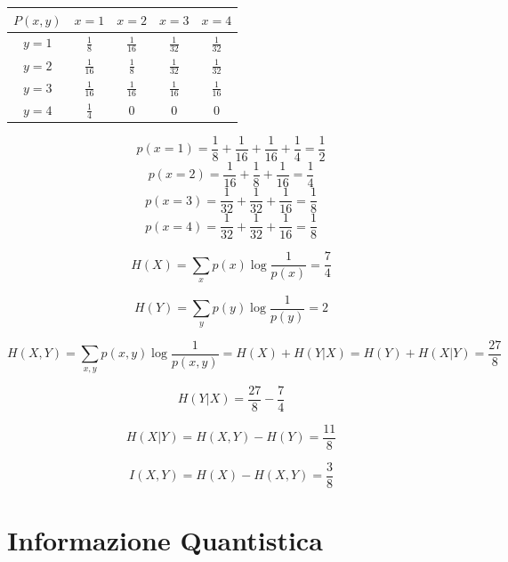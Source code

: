 \documentclass{report}
\begin{document}
\begin{table}[H]
    \centering
    \renewcommand{\arraystretch}{1.5} %
    \begin{tabular}{|c|c|c|c|c|}
        \hline
        $P(x,y)$ & $x=1$ & $x=2$ & $x=3$ & $x=4$ \\
        \hline
        $y=1$ & $\frac{1}{8}$ & $\frac{1}{16}$ & $\frac{1}{32}$ & $\frac{1}{32}$ \\
        \hline
        $y=2$ & $\frac{1}{16}$ & $\frac{1}{8}$ & $\frac{1}{32}$ & $\frac{1}{32}$ \\
        \hline
        $y=3$ & $\frac{1}{16}$ & $\frac{1}{16}$ & $\frac{1}{16}$ & $\frac{1}{16}$ \\
        \hline
        $y=4$ & $\frac{1}{4}$ & $0$ & $0$ & $0$ \\
        \hline
    \end{tabular}
    \label{tab:my_label}
\end{table}

$$p(x=1) = \frac{1}{8} + \frac{1}{16} + \frac{1}{16} + \frac{1}{4} = \frac{1}{2}$$
$$p(x=2) = \frac{1}{16} + \frac{1}{8} + \frac{1}{16} = \frac{1}{4}$$
$$p(x=3) = \frac{1}{32} + \frac{1}{32} + \frac{1}{16} = \frac{1}{8}$$
$$p(x=4) = \frac{1}{32} + \frac{1}{32} + \frac{1}{16} = \frac{1}{8}$$

$$ H(X) = \sum_xp(x) \log\frac{1}{p(x)} = \frac{7}{4}$$

$$H(Y) = \sum_y p(y)\log \frac{1}{p(y)} = 2$$

$$H(X,Y) = \sum_{x,y}p(x,y)\log\frac{1}{p(x,y)}= H(X)+H(Y|X) = H(Y)+H(X|Y) = \frac{27}{8}$$

$$ H(Y|X)= \frac{27}{8}-\frac{7}{4}$$

$$H(X|Y) = H(X,Y)-H(Y) = \frac{11}{8}$$

$$I(X,Y)=H(X)-H(X,Y)= \frac{3}{8}$$















\chapter{Informazione Quantistica}
\end{document}
